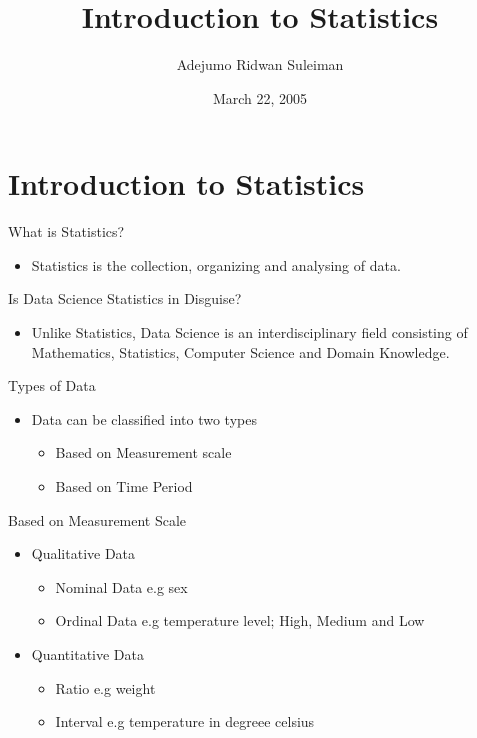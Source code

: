 \documentclass[
  ignorenonframetext,
]{beamer}
\title{Introduction to Statistics}
\author{Adejumo Ridwan Suleiman}
\date{March 22, 2005}
\providecommand{\tightlist}{%
  \setlength{\itemsep}{0pt}\setlength{\parskip}{0pt}}
\begin{document}
\frame{\titlepage}

\hypertarget{introduction-to-statistics}{%
\section{Introduction to Statistics}\label{introduction-to-statistics}}

\begin{frame}{What is Statistics?}
\protect\hypertarget{what-is-statistics}{}
\begin{itemize}
\tightlist
\item
  Statistics is the collection, organizing and analysing of data.
\end{itemize}
\end{frame}

\begin{frame}{Is Data Science Statistics in Disguise?}
\protect\hypertarget{is-data-science-statistics-in-disguise}{}
\begin{itemize}
\tightlist
\item
  Unlike Statistics, Data Science is an interdisciplinary field
  consisting of Mathematics, Statistics, Computer Science and Domain
  Knowledge.
\end{itemize}
\end{frame}

\begin{frame}{Types of Data}
\protect\hypertarget{types-of-data}{}
\begin{itemize}
\tightlist
\item
  Data can be classified into two types

  \begin{itemize}
  \tightlist
  \item
    Based on Measurement scale\\
  \item
    Based on Time Period
  \end{itemize}
\end{itemize}
\end{frame}

\begin{frame}{Based on Measurement Scale}
\protect\hypertarget{based-on-measurement-scale}{}
\begin{itemize}
\tightlist
\item
  Qualitative Data

  \begin{itemize}
  \tightlist
  \item
    Nominal Data e.g sex
  \item
    Ordinal Data e.g temperature level; High, Medium and Low
  \end{itemize}
\item
  Quantitative Data

  \begin{itemize}
  \tightlist
  \item
    Ratio e.g weight
  \item
    Interval e.g temperature in degreee celsius
  \end{itemize}
\end{itemize}
\end{frame}
\end{document}
